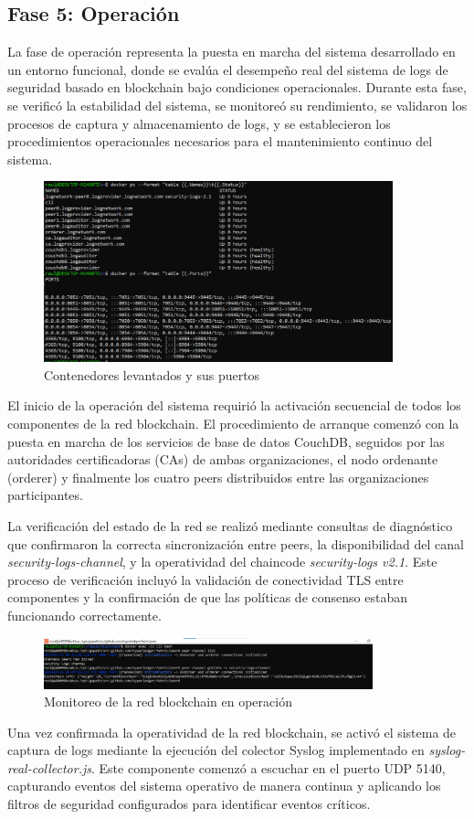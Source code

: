 \subsection{Fase 5: Operación}
La fase de operación representa la puesta en marcha del sistema desarrollado en un entorno funcional, donde se evalúa el desempeño real del sistema de logs de seguridad basado en blockchain bajo condiciones operacionales. Durante esta fase, se verificó la estabilidad del sistema, se monitoreó su rendimiento, se validaron los procesos de captura y almacenamiento de logs, y se establecieron los procedimientos operacionales necesarios para el mantenimiento continuo del sistema.
\begin{figure}[H]
\centering
\includegraphics[width=0.90\textwidth]{figuras/sistema_operacion.png}
\caption{Contenedores levantados y sus puertos }
\label{fig:sistema-operacion}
\end{figure}
El inicio de la operación del sistema requirió la activación secuencial de todos los componentes de la red blockchain. El procedimiento de arranque comenzó con la puesta en marcha de los servicios de base de datos CouchDB, seguidos por las autoridades certificadoras (CAs) de ambas organizaciones, el nodo ordenante (orderer) y finalmente los cuatro peers distribuidos entre las organizaciones participantes.

La verificación del estado de la red se realizó mediante consultas de diagnóstico que confirmaron la correcta sincronización entre peers, la disponibilidad del canal \textit{security-logs-channel}, y la operatividad del chaincode \textit{security-logs v2.1}. Este proceso de verificación incluyó la validación de conectividad TLS entre componentes y la confirmación de que las políticas de consenso estaban funcionando correctamente.
\begin{figure}[H]
\centering
\includegraphics[width=0.85\textwidth]{figuras/monitoreo_red_blockchain.png}
\caption{Monitoreo de la red blockchain en operación}
\label{fig:monitoreo-blockchain}
\end{figure}
Una vez confirmada la operatividad de la red blockchain, se activó el sistema de captura de logs mediante la ejecución del colector Syslog implementado en \textit{syslog-real-collector.js}. Este componente comenzó a escuchar en el puerto UDP 5140, capturando eventos del sistema operativo de manera continua y aplicando los filtros de seguridad configurados para identificar eventos críticos.

